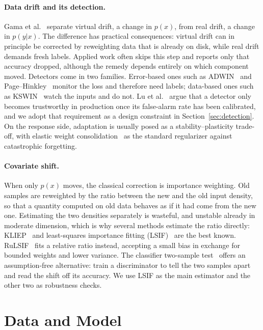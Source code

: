 \documentclass[runningheads]{llncs}
\begin{document}
\paragraph{Data drift and its detection.}
Gama et al.~\cite{gama2014} separate virtual drift, a change in $p(x)$, from
real drift, a change in $p(y|x)$. The difference has practical consequences:
virtual drift can in principle be corrected by reweighting data that is already
on disk, while real drift demands fresh labels. Applied work often skips this
step and reports only that accuracy dropped, although the remedy depends
entirely on which component moved. Detectors come in two families.
Error-based ones such as ADWIN~\cite{adwin} and Page--Hinkley~\cite{page_hinkley}
monitor the loss and therefore need labels; data-based ones such as
KSWIN~\cite{kswin} watch the inputs and do not. Lu et al.~\cite{lu2019} argue
that a detector only becomes trustworthy in production once its false-alarm rate
has been calibrated, and we adopt that requirement as a design constraint in
Section~\ref{sec:detection}. On the response side, adaptation is usually posed
as a stability--plasticity trade-off, with elastic weight
consolidation~\cite{kirkpatrick2017} as the standard regularizer against
catastrophic forgetting.

\paragraph{Covariate shift.}
When only $p(x)$ moves, the classical correction is importance weighting. Old
samples are reweighted by the ratio between the new and the old input density,
so that a quantity computed on old data behaves as if it had come from the new
one. Estimating the two densities separately is wasteful, and unstable already
in moderate dimension, which is why several methods estimate the ratio directly:
KLIEP~\cite{kliep} and least-squares importance fitting
(LSIF)~\cite{kanamori2009,sugiyama_book} are the best known.
RuLSIF~\cite{yamada2013} fits a relative ratio instead, accepting a small bias
in exchange for bounded weights and lower variance. The classifier two-sample
test~\cite{lopezpaz2017} offers an assumption-free alternative: train a
discriminator to tell the two samples apart and read the shift off its accuracy.
We use LSIF as the main estimator and the other two as robustness checks.

\section{Data and Model}
\label{sec:method}
\end{document}
